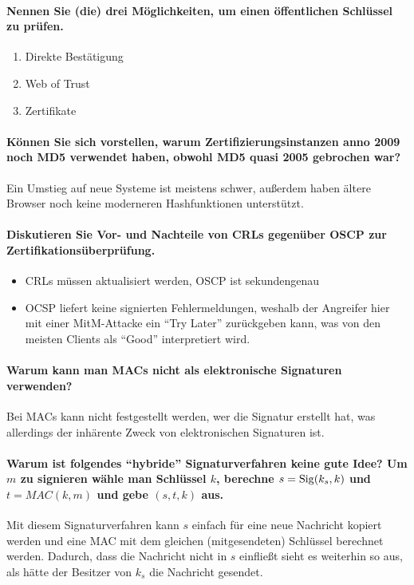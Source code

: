 			\paragraph{Nennen Sie (die) drei Möglichkeiten, um einen öffentlichen Schlüssel zu prüfen.}
			\begin{enumerate}
				\item Direkte Bestätigung
				\item Web of Trust
				\item Zertifikate
			\end{enumerate}
			
			\paragraph{Können Sie sich vorstellen, warum Zertifizierungsinstanzen anno 2009 noch MD5 verwendet haben, obwohl MD5 quasi 2005 gebrochen war?}
			Ein Umstieg auf neue Systeme ist meistens schwer, außerdem haben ältere Browser noch keine moderneren Hashfunktionen unterstützt.
			
			\paragraph{Diskutieren Sie Vor- und Nachteile von CRLs gegenüber OSCP zur Zertifikationsüberprüfung.}
			\begin{itemize}
				\item CRLs müssen aktualisiert werden, OSCP ist sekundengenau
				\item OCSP liefert keine signierten Fehlermeldungen, weshalb der Angreifer hier mit einer MitM-Attacke ein \enquote{Try Later} zurückgeben kann, was von den meisten Clients als \enquote{Good} interpretiert wird.
			\end{itemize}
			
			\paragraph{Warum kann man MACs nicht als elektronische Signaturen verwenden?}
			Bei MACs kann nicht festgestellt werden, wer die Signatur erstellt hat, was allerdings der inhärente Zweck von elektronischen Signaturen ist.
			
			\paragraph{Warum ist folgendes \enquote{hybride} Signaturverfahren keine gute Idee? Um \(m\) zu signieren wähle man Schlüssel \(k\), berechne \(s = \operatorname{Sig}(k_s, k) \) und \(t = MAC(k, m)\) und gebe \((s, t, k)\) aus.}
			Mit diesem Signaturverfahren kann \(s\) einfach für eine neue Nachricht kopiert werden und eine MAC mit dem gleichen (mitgesendeten) Schlüssel berechnet werden. Dadurch, dass die Nachricht nicht in \(s\) einfließt sieht es weiterhin so aus, als hätte der Besitzer von \(k_s\) die Nachricht gesendet.
			
